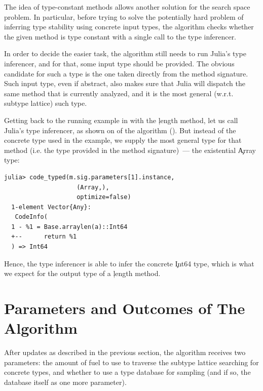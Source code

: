 The idea of type-constant methods allows another solution for the search space
problem. In particular, before trying to solve the potentially hard problem of
inferring type stability using concrete input types,
the algorithm checks whether the given method is
type constant with a single call to the type inferencer.


In order to decide the easier task, the algorithm still needs to run Julia's
type inferencer, and for that, some input type should be provided. The obvious
candidate for such a type is the one taken directly from the method signature.
Such input type, even if abstract, also makes sure that Julia will dispatch the
same method that is currently analyzed, and it is the most general (w.r.t.
subtype lattice) such type.

Getting back to the running example in  with the
\c{length} method, let us call Julia's type inferencer, as
shown on  of the algorithm (). But
instead of the concrete type used in the example, we supply the most general type
for that method (i.e. the type provided in the method signature)~--- the
existential \c{Array} type:
\begin{lstlisting}[style=jterm]
  julia> code_typed(m.sig.parameters[1].instance,
                    (Array,),
                    optimize=false)
  1-element Vector{Any}:
   CodeInfo(
  1 - %1 = Base.arraylen(a)::Int64
  +--      return %1
  ) => Int64
\end{lstlisting}
Hence, the type inferencer is able to infer the concrete \c{Int64} type, which
is what we expect for the output type of a \c{length} method.

\section{Parameters and Outcomes of The Algorithm} %
\label{sec:approx:algo-final}

After updates as described in the previous section, the algorithm receives two
parameters: the amount of fuel to use to traverse the subtype lattice searching
for concrete types, and whether to
use a type database for sampling (and if so, the database itself as one more
parameter).

